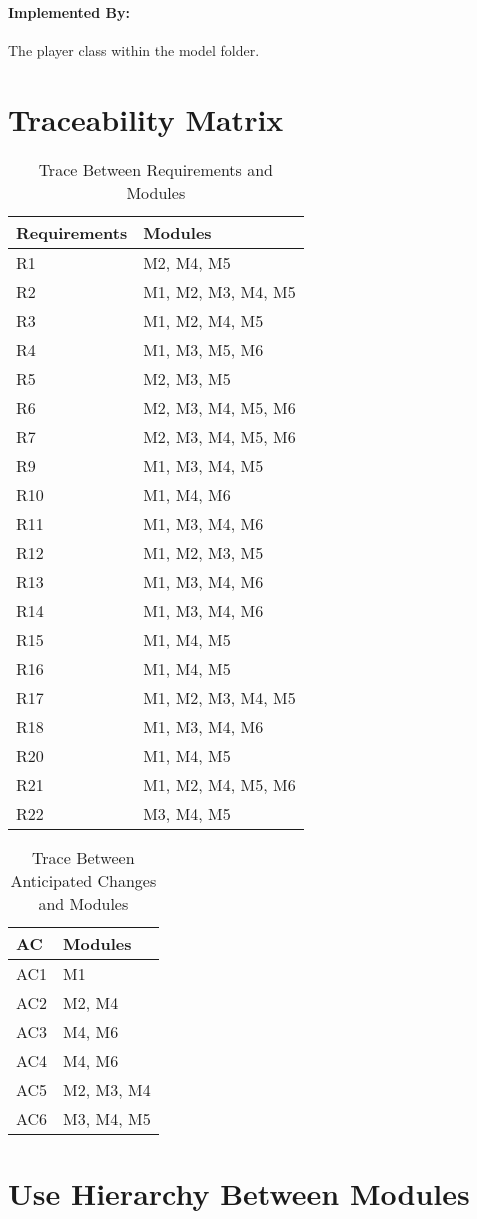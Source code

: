 \documentclass[12pt,letterpaper]{article}
\begin{document}
	\paragraph{Implemented By: } The player class within the model folder.

	\section{Traceability Matrix}

\begin{table}[h!]
\centering
\begin{tabular}{p{} p{}}
\toprule
\textbf{Requirements} & \textbf{Modules}\\
\midrule
{R1} & M2, M4, M5 \\
{R2} & M1, M2, M3, M4, M5 \\
{R3} & M1, M2, M4, M5 \\
{R4} & M1, M3, M5, M6 \\
{R5} & M2, M3, M5 \\
{R6} & M2, M3, M4, M5, M6 \\
{R7} & M2, M3, M4, M5, M6 \\
{R9} & M1, M3, M4, M5 \\
{R10} & M1, M4, M6\\
{R11} & M1, M3, M4, M6\\
{R12} & M1, M2, M3, M5\\
{R13} & M1, M3, M4, M6\\
{R14} & M1, M3, M4, M6\\
{R15} & M1, M4, M5\\
{R16} & M1, M4, M5\\
{R17} & M1, M2, M3, M4, M5\\
{R18} & M1, M3, M4, M6\\
{R20} & M1, M4, M5\\
{R21} & M1, M2, M4, M5, M6\\
{R22} & M3, M4, M5\\
\bottomrule
\end{tabular}
\caption{Trace Between Requirements and Modules}
\label{TblRT}
\end{table}
\begin{table}[h!]
\centering
\begin{tabular}{p{} p{}}
\toprule
\textbf{AC} & \textbf{Modules}\\
\midrule
{AC1} & M1 \\
{AC2} & M2, M4 \\
{AC3} & M4, M6 \\
{AC4} & M4,  M6 \\
{AC5} & M2, M3, M4 \\
{AC6} & M3, M4, M5 \\
\bottomrule
\end{tabular}
\caption{Trace Between Anticipated Changes and Modules}
\label{TblACT}
\end{table}
\clearpage
	\section{Use Hierarchy Between Modules}
\end{document}
